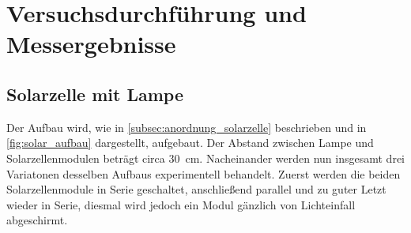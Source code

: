 \documentclass[english, ngerman]{scrartcl}
\begin{document}
\section{Versuchsdurchführung und Messergebnisse}
\label{sec:versuchsdurchfuehrung_messergebnisse}

\subsection{Solarzelle mit Lampe}
\label{subsec:durchfuehrung_solar_lampe}
Der Aufbau wird, wie in \autoref{subsec:anordnung_solarzelle} beschrieben und in \autoref{fig:solar_aufbau} dargestellt, aufgebaut. Der Abstand zwischen Lampe und Solarzellenmodulen beträgt circa \SI{30}{cm}. Nacheinander werden nun insgesamt drei Variatonen desselben Aufbaus experimentell behandelt. Zuerst werden die beiden Solarzellenmodule in Serie geschaltet, anschließend parallel und zu guter Letzt wieder in Serie, diesmal wird jedoch ein Modul gänzlich von Lichteinfall abgeschirmt.
\end{document}
